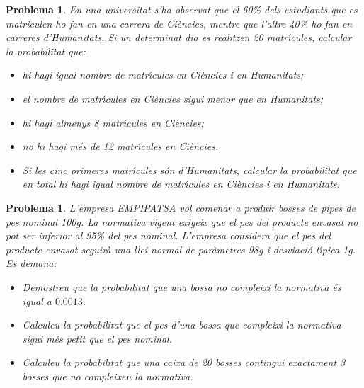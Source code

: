 \documentclass[a4paper,10pt]{article}
\newcounter{prbcont}
\newtheorem{problema}[prbcont]{Problema}
\begin{document}
\begin{problema}
En una universitat s'ha observat que el 60\% dels estudiants que es
matriculen ho fan en una carrera de Ci\`encies, mentre que l'altre 40\%
ho fan en carreres d'Humanitats. Si un determinat dia es realitzen
20 matr\'{\i}cules, calcular la probabilitat que:
\begin{itemize}
\item [a)] hi hagi igual nombre de matr\'{\i}cules en Ci\`encies i en Humanitats;
\item [b)] el nombre de matr\'{\i}cules en Ci\`encies sigui menor que en Humanitats;
\item [c)] hi hagi almenys 8 matr\'{\i}cules en Ci\`encies;
\item [d)] no hi hagi m\'es de 12 matr\'{\i}cules en Ci\`encies.
\item [e)] Si les cinc primeres matr\'{\i}cules s\'on d'Humanitats, calcular la
probabilitat que en total hi hagi igual nombre de matr\'{\i}cules en Ci\`encies i en Humanitats.
\end{itemize}
\end{problema}

\begin{problema}
L'empresa \textsc{EMPIPATSA} vol comenar a produir bosses de pipes de pes nominal 100g. La normativa vigent exigeix que el pes del producte envasat no
pot ser inferior al 95\% del pes nominal. L'empresa considera que el pes del producte
envasat seguir\`a una llei normal de par\`ametres 98g i desviaci\'o t\'{\i}pica 1g. Es demana:
\begin{itemize}
\item [a)] Demostreu que la probabilitat que una bossa no compleixi la normativa \'es
igual a $0.0013.$
\item [b)] Calculeu la probabilitat que el pes d'una bossa que compleixi la normativa sigui m\'es petit que el pes nominal. 
\item [c)] Calculeu la probabilitat que una caixa de 20 bosses contingui exactament
3 bosses que no compleixen la normativa.
\end{itemize}
\end{problema}
\end{document}
